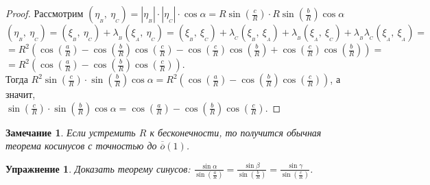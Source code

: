 \documentclass[12pt]{article}
\theoremstyle{plain}
\newtheorem*{exercise}{Упражнение}
\newtheorem{remark}{Замечание}
\begin{document}
\begin{proof}
        Рассмотрим $\left(\eta_{_B}, \ \eta_{_C}\right)=|\eta_{_B}|\cdot|\eta_{_C}|\cdot\cos\alpha=R\sin\left(\frac{c}{R}\right)\cdot R\sin\left(\frac{b}{R}\right)\cos\alpha$\\
        $\left(\eta_{_B}, \ \eta_{_C}\right)=\left(\xi_{_B}, \ \eta_{_C}\right)+\lambda_{_B}\left(\xi_{_A}, \ \eta_{_C}\right)=\left(\xi_{_B}, \ \xi_{_C}\right)+\lambda_{_C}\left(\xi_{_B}, \ \xi_{_A}\right)+\lambda_{_B}\left(\xi_{_A}, \ \xi_{_C}\right)+\lambda_{_B}\lambda_{_C}\left(\xi_{_A}, \ \xi_{_A}\right)=$\\
        $=R^2\left(\cos\left(\frac{a}{R}\right)-\cos\left(\frac{b}{R}\right)\cos\left(\frac{c}{R}\right)-\cos\left(\frac{c}{R}\right)\cos\left(\frac{b}{R}\right)+\cos\left(\frac{c}{R}\right)\cos\left(\frac{b}{R}\right)\right)=$\\ $=R^2\left(\cos\left(\frac{a}{R}\right)-\cos\left(\frac{b}{R}\right)\cos\left(\frac{c}{R}\right)\right)$.\\
        Тогда $R^2\sin\left(\frac{c}{R}\right)\cdot \sin\left(\frac{b}{R}\right)\cos\alpha=R^2\left(\cos\left(\frac{a}{R}\right)-\cos\left(\frac{b}{R}\right)\cos\left(\frac{c}{R}\right)\right)$, а значит,\\$\sin\left(\frac{c}{R}\right)\cdot \sin\left(\frac{b}{R}\right)\cos\alpha=\cos\left(\frac{a}{R}\right)-\cos\left(\frac{b}{R}\right)\cos\left(\frac{c}{R}\right)$.
    \end{proof}
    \begin{remark}
        Если устремить $R$ к бесконечности, то получится обычная теорема косинусов с точностью до $\overline{\overline{o}}(1)$.
    \end{remark}
    \begin{exercise}
        Доказать теорему синусов: $\frac{\sin\alpha}{\sin\left(\frac{a}{R}\right)}=\frac{\sin\beta}{\sin\left(\frac{b}{R}\right)}=\frac{\sin\gamma}{\sin\left(\frac{c}{R}\right)}$.
    \end{exercise}
\end{document}

